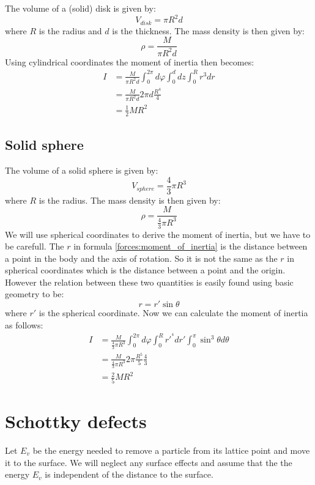 	The volume of a (solid) disk is given by:
	\begin{equation}
		V_{disk} = \pi R^2d
	\end{equation}
	where $R$ is the radius and $d$ is the thickness. The mass density is then given by:
	\begin{equation}
		\rho = \frac{M}{\pi R^2d}
	\end{equation}
	Using cylindrical coordinates the moment of inertia then becomes:
	\begin{align}
		I &= \frac{M}{\pi R^2d}\int_0^{2\pi}d\varphi\int_0^ddz\int_0^Rr^3dr\\
		&= \frac{M}{\pi R^2d}2\pi d\frac{R^4}{4}\\
		&= \frac{1}{2}MR^2
	\end{align}
	
\subsection{Solid sphere}

	The volume of a solid sphere is given by:
	\begin{equation}
		V_{sphere} = \frac{4}{3}\pi R^3
	\end{equation}
	where $R$ is the radius. The mass density is then given by:
	\begin{equation}
		\rho = \frac{M}{\frac{4}{3}\pi R^3}
	\end{equation}
	We will use spherical coordinates to derive the moment of inertia, but we have to be carefull. The $r$ in formula \ref{forces:moment_of_inertia} is the distance between a point in the body and the axis of rotation. So it is not the same as the $r$ in spherical coordinates which is the distance between a point and the origin. However the relation between these two quantities is easily found using basic geometry to be:
	\begin{equation}
		r = r'\sin\theta
	\end{equation}
	where $r'$ is the spherical coordinate. Now we can calculate the moment of inertia as follows:
	\begin{align}
		I &= \frac{M}{\frac{4}{3}\pi R^3} \int_0^{2\pi}d\varphi\int_0^Rr'^{^4}dr'\int_0^\pi\sin^3\theta d\theta\\
		&= \frac{M}{\frac{4}{3}\pi R^3} 2\pi \frac{R^5}{5} \frac{4}{3}\\
		&= \frac{2}{5}MR^2
	\end{align}

\section{Schottky defects}\label{deriv:schottky_defects}
	Let $E_v$ be the energy needed to remove a particle from its lattice point and move it to the surface. We will neglect any surface effects and assume that the the energy $E_v$ is independent of the distance to the surface.
    
